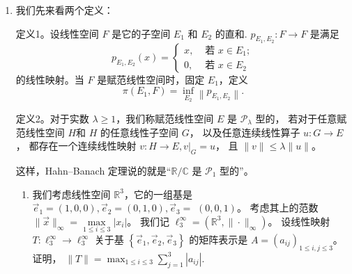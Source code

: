 \begin{enumerate}
\begin{proofc}
(4) 第一个蕴涵关系即（3）。

对于第二个蕴涵关系，如果 $\|T\|>1$，那么存在 $\lambda \in\{\|T\|,-\|T\|\}$ 是 $T$ 的特征值。
于是：若 $T x=-\|T\| x$，则 $\langle T x, x\rangle=-\|T\|\|x\|^{2}<0$，矛盾；
若 $T x=\|T\| x$，则 $\langle(T-T^{2}) x, x\rangle=\|T\|(1-\|T\|)\|x\|^{2}<0$，也矛盾。

(5) 如果 $n=2k$，那么 $T^{n}-T^{n+1}=(T^{k})^{*}(I_{H}-T) T^{k}$；
如果 $n=2k+1$，那么 $T^{n}-T^{n+1}=(T^{k})^{*}(T-T^{2}) T^{k}$.

(6) 首先，$\langle T^{n} x, x\rangle$ 是一个有界数列，从而有收敛子列。
而由（5）可知数列 $\langle T^{n} x, x\rangle$ 是单调的，从而整个数列收敛。

(7) 注意到正算子的和还是正算子，所以对于 $m<n$，我们有
\[\|(T^{m}-T^{n}) x\|^{4}=\left|\langle(T^{m}-T^{n}) x,(T^{m}-T^{n}) x\rangle\right|^{2} 
\leqslant\langle(T^{m}-T^{n}) x, x\rangle\langle(T^{m}-T^{n})^{2} x,(T^{m}-T^{n}) x\rangle.\]
最右边第二个因子是有界的($\left\|T^{m}-T^{n}\right\| \leqslant 2$)，
第一个因子收敛到 $0$ (根据(6))，从而 $\{T^{n} x\}$ 是 $H$ 中的 Cauchy 列。

(8) 由 $T^{*}=T$ 即可知 $P^{*}=P$，而 $T P x=T \lim T^{n} x=\lim T^{n+1} x=P x$。

(9) 容易看到，$T$ 的不动点也是 $P$ 的不动点，从而由（8）的结论可知 $P^{2}=P$，从而 $P$ 是投影算子。
（事实上， $\operatorname{Ran} P=\ker(I_{H}-T)$。）
\end{proofc}
\item 我们先来看两个定义：

定义1。设线性空间 $F$ 是它的子空间 $E_{1}$ 和 $E_{2}$ 的直和. 
$p_{E_{1}, E_{2}}: F \rightarrow F$ 是满足
$$
p_{E_{1}, E_{2}}(x)= \begin{cases}x, & \text { 若 } x \in E_{1} ; \\ 0, & \text { 若 } x \in E_{2} \end{cases}
$$
的线性映射。当 $F$ 是赋范线性空间时，固定 $E_{1}$，定义
$$\pi(E_{1}, F)=\inf_{E_{2}}\left\|p_{E_{1}, E_{2}}\right\|.$$

定义2。对于实数 $\lambda \geqslant 1$，我们称赋范线性空间 $E$ 是 $\mathcal{P}_{\lambda}$ 型的，
若对于任意赋范线性空间 $H$和 $H$ 的任意线性子空间 $G$，
以及任意连续线性算子 $u: G \rightarrow E$，
都存在一个连续线性映射 $v: H \rightarrow E,\left.v\right|_{G}=u$，
且 $\|v\| \leqslant \lambda\|u\|$。

这样，Hahn--Banach 定理说的就是``$\mathbb{R} / \mathbb{C}$ 是 $\mathcal{P}_{1}$ 型的''。
\begin{enumerate}[label=(\arabic*)]
\item 我们考虑线性空间 $\mathbb{R}^{3}$，它的一组基是 $\vec{e}_{1}=(1,0,0), \vec{e}_{2}=(0,1,0), \vec{e}_{3}=$ $(0,0,1)$。
考虑其上的范数 $\|\vec{x}\|_{\infty}=\max \limits_{1 \leqslant i \leqslant 3}|x_{i}|$。
我们记 $\ell_{3}^{\infty}=\left(\mathbb{R}^{3},\|\cdot\|_{\infty}\right)$。
设线性映射 $T: \ell_{3}^{\infty} \rightarrow \ell_{3}^{\infty}$ 关于基 $\left\{\vec{e}_{1}, \vec{e}_{2}, \vec{e}_{3}\right\}$ 的矩阵表示是 
$A=(a_{ij})_{1 \leqslant i, j \leqslant 3}$。
证明， $\displaystyle\|T\|=\max_{1 \leqslant i \leqslant 3} \sum_{j=1}^{3}|a_{ij}|$.


\end{enumerate}
\end{enumerate}
